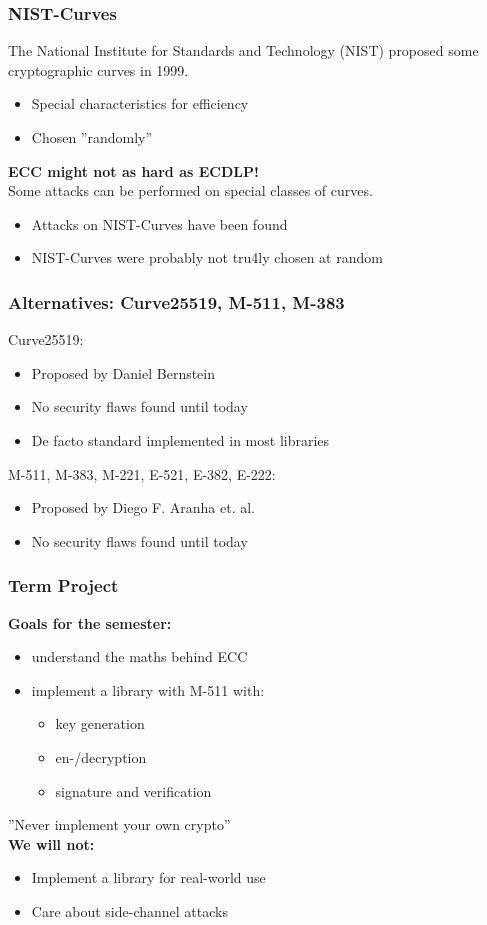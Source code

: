 \documentclass{beamer}
\begin{document}
\begin{frame}
	\frametitle{NIST-Curves}
	The National Institute for Standards and Technology (NIST) proposed some cryptographic curves in 1999.
	\begin{itemize}
		\item Special characteristics for efficiency
		\item Chosen ''randomly''
	\end{itemize}
	\vspace{1cm}
	\textbf{ECC might not as hard as ECDLP!} \\
	Some attacks can be performed on special classes of curves.
	\begin{itemize}
		\item Attacks on NIST-Curves have been found
		\item NIST-Curves were probably not tru4ly chosen at random
	\end{itemize}
	\cite{bernstein2016safecurves}
\end{frame}
\begin{frame}
	\frametitle{Alternatives: Curve25519, M-511, M-383}
	Curve25519:
	\begin{itemize}
		\item Proposed by Daniel Bernstein \cite{bernstein2006curve25519}
		\item No security flaws found until today
		\item De facto standard implemented in most libraries
	\end{itemize}
	\vspace{1cm}
	M-511, M-383, M-221, E-521, E-382, E-222:
	\begin{itemize}
		\item Proposed by Diego F. Aranha et. al. \cite{cryptoeprint:2013:647}
		\item No security flaws found until today
	\end{itemize}
\end{frame}
	\begin{frame}
		\frametitle{Term Project}
		\textbf{Goals for the semester:}
		\begin{itemize}
			\item understand the maths behind ECC
			\item implement a library with M-511 with:
			\begin{itemize}
				\item key generation
				\item en-/decryption
				\item signature and verification
			\end{itemize}
		\end{itemize}
	
		\vspace{0.8cm}
		''Never implement your own crypto'' \\
		\vspace{0.8cm}
		\textbf{We will not:}
		\begin{itemize}
			\item Implement a library for real-world use
			\item Care about side-channel attacks
		\end{itemize}
	\end{frame}
\end{document}

